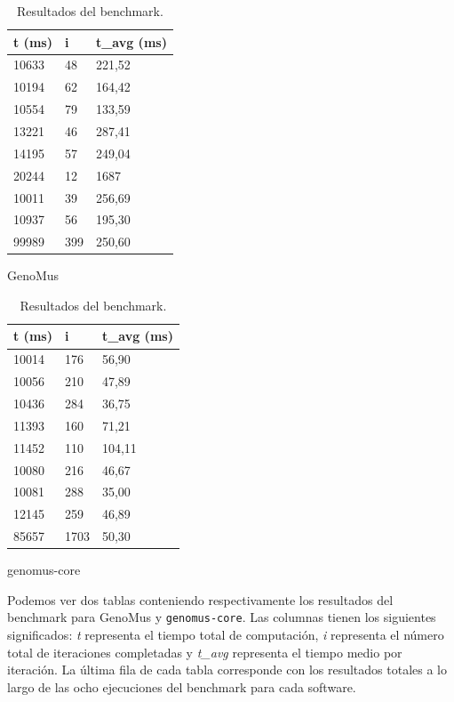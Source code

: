 \begin{table}[h]
    \begin{subtable}[h]{0.45\textwidth}
        \centering
        \begin{tabular}{p{1.5cm} p{1cm} p{1.8cm}}
            t (ms) & i & t\_avg (ms) \\ \hline \hline
            
            10633 & 48 & 221,52 \\ 
            10194 & 62 & 164,42 \\ 
            10554 & 79 & 133,59 \\ 
            13221 & 46 & 287,41 \\ 
            14195 & 57 & 249,04 \\ 
            20244 & 12 & 1687 \\ 
            10011 & 39 & 256,69 \\ 
            10937 & 56 & 195,30 \\ \hline
            99989 & 399 & 250,60 \\ 
            
        \end{tabular}
       \caption{GenoMus}
       \label{tab:genomus_benchmark}
    \end{subtable}
    \hfill
    \begin{subtable}[h]{0.45\textwidth}
        \centering
        \begin{tabular}{p{1.5cm} p{1cm} p{1.8cm}}
            t (ms) & i & t\_avg (ms) \\ \hline \hline
            10014 & 176 & 56,90 \\ 
            10056 & 210 & 47,89 \\ 
            10436 & 284 & 36,75 \\ 
            11393 & 160 & 71,21 \\ 
            11452 & 110 & 104,11 \\ 
            10080 & 216 & 46,67 \\ 
            10081 & 288 & 35,00 \\ 
            12145 & 259 & 46,89 \\ \hline
            85657 & 1703 & 50,30 \\ 
        \end{tabular}
       \caption{genomus-core}
       \label{tab:genomus-core_benchmark}
     \end{subtable}
     \caption{Resultados del benchmark.} Podemos ver dos tablas conteniendo respectivamente los resultados del benchmark para GenoMus y \verb|genomus-core|. Las columnas tienen los siguientes significados: \textit{t} representa el tiempo total de computación, \textit{i} representa el número total de iteraciones completadas y \textit{t\_avg} representa el tiempo medio por iteración. La última fila de cada tabla corresponde con los resultados totales a lo largo de las ocho ejecuciones del benchmark para cada software.
     \label{tab:resultados_benchmark}
\end{table}

